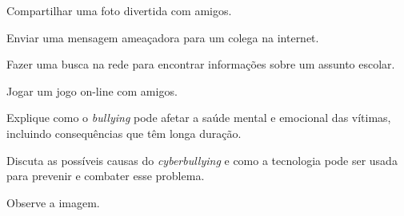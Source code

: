 \startitemize[a][color=Blue2,style=bf]
\item Compartilhar uma foto divertida com amigos.

 Enviar uma mensagem ameaçadora para um colega na internet.

\item Fazer uma busca na rede para encontrar informações sobre um assunto
escolar.

\item Jogar um jogo on-line com amigos.
\stopitemize

\item Explique como o {\em bullying} pode afetar a saúde mental e emocional
das vítimas, incluindo consequências que têm longa duração.

\thinrules[n=8,color=Blue2]


\item Discuta as possíveis causas do {\em cyberbullying} e como a
tecnologia pode ser usada para prevenir e combater esse problema.

\thinrules[n=8,color=Blue2]


\page

\item Observe a imagem.

\placefigure{}
{}


